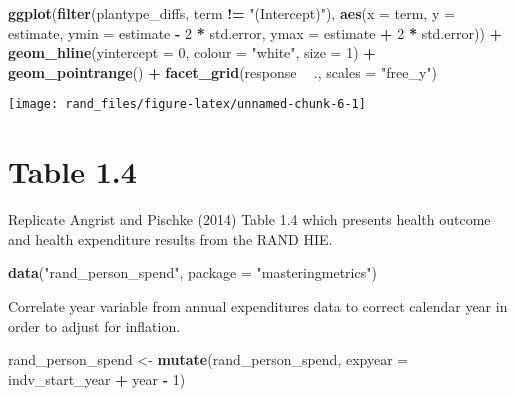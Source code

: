 \documentclass[]{book}
\newenvironment{Shaded}{\begin{snugshade}}{\end{snugshade}}
\newcommand{\DataTypeTok}[1]{\textcolor[rgb]{0.13,0.29,0.53}{#1}}
\newcommand{\DecValTok}[1]{\textcolor[rgb]{0.00,0.00,0.81}{#1}}
\newcommand{\KeywordTok}[1]{\textcolor[rgb]{0.13,0.29,0.53}{\textbf{#1}}}
\newcommand{\NormalTok}[1]{#1}
\newcommand{\OperatorTok}[1]{\textcolor[rgb]{0.81,0.36,0.00}{\textbf{#1}}}
\newcommand{\StringTok}[1]{\textcolor[rgb]{0.31,0.60,0.02}{#1}}
\theoremstyle{definition}
\theoremstyle{definition}
\theoremstyle{definition}
\theoremstyle{remark}
\begin{document}
\begin{Shaded}
\begin{Highlighting}[]
\KeywordTok{ggplot}\NormalTok{(}\KeywordTok{filter}\NormalTok{(plantype_diffs, term }\OperatorTok{!=}\StringTok{ "(Intercept)"}\NormalTok{),}
              \KeywordTok{aes}\NormalTok{(}\DataTypeTok{x =}\NormalTok{ term, }\DataTypeTok{y =}\NormalTok{ estimate,}
                  \DataTypeTok{ymin =}\NormalTok{ estimate }\OperatorTok{-}\StringTok{ }\DecValTok{2} \OperatorTok{*}\StringTok{ }\NormalTok{std.error,}
                  \DataTypeTok{ymax =}\NormalTok{ estimate }\OperatorTok{+}\StringTok{ }\DecValTok{2} \OperatorTok{*}\StringTok{ }\NormalTok{std.error)) }\OperatorTok{+}
\StringTok{  }\KeywordTok{geom_hline}\NormalTok{(}\DataTypeTok{yintercept =} \DecValTok{0}\NormalTok{, }\DataTypeTok{colour =} \StringTok{"white"}\NormalTok{, }\DataTypeTok{size =} \DecValTok{1}\NormalTok{) }\OperatorTok{+}
\StringTok{  }\KeywordTok{geom_pointrange}\NormalTok{() }\OperatorTok{+}
\StringTok{  }\KeywordTok{facet_grid}\NormalTok{(response }\OperatorTok{~}\StringTok{ }\NormalTok{., }\DataTypeTok{scales =} \StringTok{"free_y"}\NormalTok{)}
\end{Highlighting}
\end{Shaded}

\begin{center}\texttt{[image: rand\_files/figure-latex/unnamed-chunk-6-1]} \end{center}

\hypertarget{table-1.4}{%
\section{Table 1.4}\label{table-1.4}}

Replicate Angrist and Pischke (2014) Table 1.4 which presents health
outcome and health expenditure results from the RAND HIE.

\begin{Shaded}
\begin{Highlighting}[]
\KeywordTok{data}\NormalTok{(}\StringTok{"rand_person_spend"}\NormalTok{, }\DataTypeTok{package =} \StringTok{"masteringmetrics"}\NormalTok{)}
\end{Highlighting}
\end{Shaded}

Correlate year variable from annual expenditures data to correct
calendar year in order to adjust for inflation.

\begin{Shaded}
\begin{Highlighting}[]
\NormalTok{rand_person_spend <-}\StringTok{ }\KeywordTok{mutate}\NormalTok{(rand_person_spend,}
                            \DataTypeTok{expyear =}\NormalTok{ indv_start_year }\OperatorTok{+}\StringTok{ }\NormalTok{year }\OperatorTok{-}\StringTok{ }\DecValTok{1}\NormalTok{)}
\end{Highlighting}
\end{Shaded}
\end{document}
